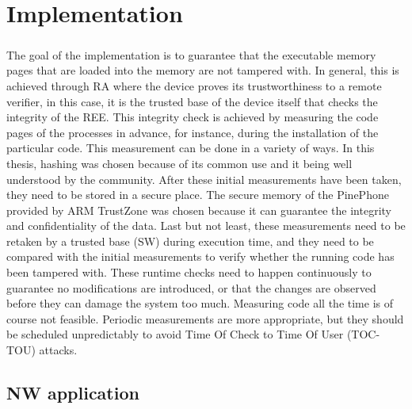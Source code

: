\chapter{Implementation}

\paragraph*{}
The goal of the implementation is to guarantee that the executable memory pages that are loaded into the memory are not tampered with. In general, this is achieved through RA where the device proves its trustworthiness to a remote verifier, in this case, it is the trusted base of the device itself that checks the integrity of the REE. This integrity check is achieved by measuring the code pages of the processes in advance, for instance, during the installation of the particular code. This measurement can be done in a variety of ways. In this thesis, hashing was chosen because of its common use and it being well understood by the community. After these initial measurements have been taken, they need to be stored in a secure place. The secure memory of the PinePhone provided by ARM TrustZone was chosen because it can guarantee the integrity and confidentiality of the data. Last but not least, these measurements need to be retaken by a trusted base (SW) during execution time, and they need to be compared with the initial measurements to verify whether the running code has been tampered with. These runtime checks need to happen continuously to guarantee no modifications are introduced, or that the changes are observed before they can damage the system too much. Measuring code all the time is of course not feasible. Periodic measurements are more appropriate, but they should be scheduled unpredictably to avoid Time Of Check to Time Of User (TOC-TOU) attacks.

\section{NW application}

